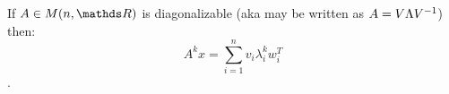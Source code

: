 \documentclass[computational_mathematics.tex]{subfiles}
\begin{document}

\begin{proposition}
  If $A \in M(n, \R)$ is diagonalizable (aka may be written as $A = V \Lambda {V}^{-1}$) 
  then:
  $$A^k x = \sum\limits_{i=1}^{n} v_i\lambda^k_i w_i^T$$. 
\end{proposition}
\end{document}
